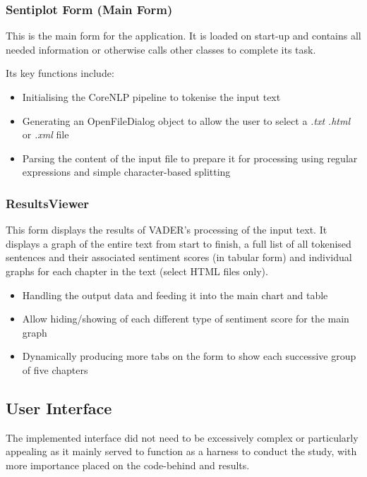 \documentclass{article}
\begin{document}
{        \subsubsection{Sentiplot Form (Main Form)}
            This is the main form for the application. It is loaded on start-up and contains all needed information or otherwise calls other classes to complete its task.

            Its key functions include:
            \begin{itemize}
                \item Initialising the CoreNLP pipeline to tokenise the input text
                \item Generating an OpenFileDialog object to allow the user to select a \textit{.txt} \textit{.html} or \textit{.xml} file
                \item Parsing the content of the input file to prepare it for processing using regular expressions and simple character-based splitting
            \end{itemize}
        \subsubsection{ResultsViewer}
            This form displays the results of VADER's processing of the input text. It displays a graph of the entire text from start to finish, a full list of all tokenised sentences and their associated sentiment scores (in tabular form) and individual graphs for each chapter in the text (select HTML files only).

            \begin{itemize}
                \item Handling the output data and feeding it into the main chart and table
                \item Allow hiding/showing of each different type of sentiment score for the main graph
                \item Dynamically producing more tabs on the form to show each successive group of five chapters
            \end{itemize}
    \subsection{User Interface}
        The implemented interface did not need to be excessively complex or particularly appealing as it mainly served to function as a harness to conduct the study, with more importance placed on the code-behind and results.

}
\end{document}
